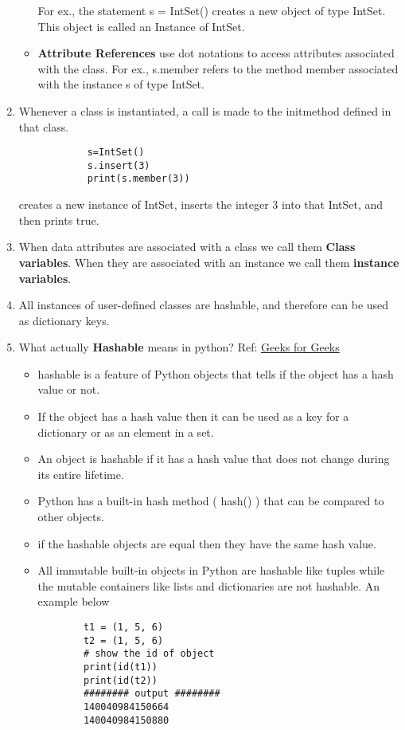 \documentclass[11pt]{article}
\begin{document}
\begin{enumerate}
\begin{itemize}
            For ex., the statement s = IntSet() creates a new object of type IntSet. This object is called an Instance of IntSet.
            \item \textbf{Attribute References} use dot notations to access attributes associated with the class. For ex., s.member refers to the method member associated with the instance s of type IntSet.
        \end{itemize}
        \item Whenever a class is instantiated, a call is made to the \textunderscore\textunderscore init\textunderscore\textunderscore method defined in that class.
        \begin{verbatim}
            s=IntSet()
            s.insert(3)
            print(s.member(3))
        \end{verbatim}
        creates a new instance of IntSet, inserts the integer 3 into that IntSet, and then prints true.
        \item When data attributes are associated with a class we call them \textbf{Class variables}. When they are associated with an instance we call them \textbf{instance variables}.
        \item All instances of user-defined classes are hashable, and therefore can be used as dictionary keys.
        \item What actually \textbf{Hashable} means in python? Ref: \href{https://www.geeksforgeeks.org/why-and-how-are-python-functions-hashable/}{Geeks for Geeks}
        \begin{itemize}
            \item hashable is a feature of Python objects that tells if the object has a hash value or not.
            \item If the object has a hash value then it can be used as a key for a dictionary or as an element in a set.
            \item An object is hashable if it has a hash value that does not change during its entire lifetime.
            \item Python has a built-in hash method ( \textunderscore\textunderscore hash\textunderscore\textunderscore() ) that can be compared to other objects.
            \item if the hashable objects are equal then they have the same hash value.
            \item All immutable built-in objects in Python are hashable like tuples while the mutable containers like lists and dictionaries are not hashable. An example below
            \begin{verbatim}
        t1 = (1, 5, 6)
        t2 = (1, 5, 6)
        # show the id of object
        print(id(t1))
        print(id(t2))
        ######## output ########
        140040984150664
        140040984150880
            \end{verbatim}
        \end{itemize}
    \end{enumerate}
\end{document}
